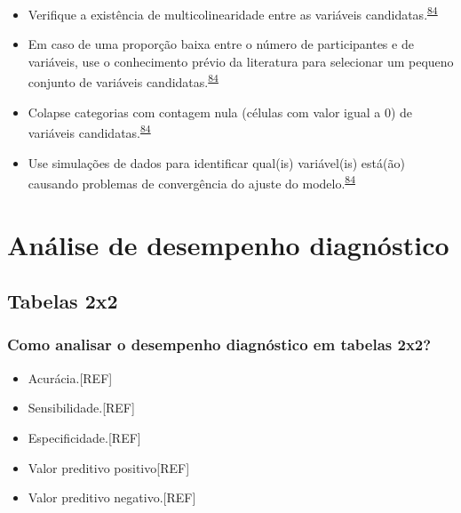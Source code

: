 \documentclass[
]{book}
\begin{document}
\begin{itemize}
\item
  Verifique a existência de multicolinearidade entre as variáveis candidatas.\textsuperscript{\protect\hyperlink{ref-Sun1996}{84}}
\item
  Em caso de uma proporção baixa entre o número de participantes e de variáveis, use o conhecimento prévio da literatura para selecionar um pequeno conjunto de variáveis candidatas.\textsuperscript{\protect\hyperlink{ref-Sun1996}{84}}
\item
  Colapse categorias com contagem nula (células com valor igual a 0) de variáveis candidatas.\textsuperscript{\protect\hyperlink{ref-Sun1996}{84}}
\item
  Use simulações de dados para identificar qual(is) variável(is) está(ão) causando problemas de convergência do ajuste do modelo.\textsuperscript{\protect\hyperlink{ref-Sun1996}{84}}
\end{itemize}

\hypertarget{analise-desempenho-diagnostico}{%
\chapter{\texorpdfstring{\textbf{Análise de desempenho diagnóstico}}{Análise de desempenho diagnóstico}}\label{analise-desempenho-diagnostico}}

\hypertarget{tabelas-2x2}{%
\section{Tabelas 2x2}\label{tabelas-2x2}}

\hypertarget{como-analisar-o-desempenho-diagnuxf3stico-em-tabelas-2x2}{%
\subsection{Como analisar o desempenho diagnóstico em tabelas 2x2?}\label{como-analisar-o-desempenho-diagnuxf3stico-em-tabelas-2x2}}

\begin{itemize}
\item
  Acurácia.{[}REF{]}
\item
  Sensibilidade.{[}REF{]}
\item
  Especificidade.{[}REF{]}
\item
  Valor preditivo positivo{[}REF{]}
\item
  Valor preditivo negativo.{[}REF{]}
\end{itemize}
\end{document}
